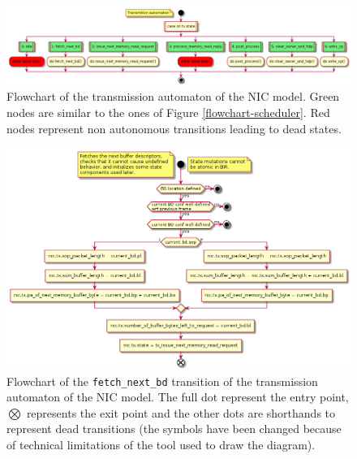 \documentclass[10pt,a4paper]{article}
\begin{document}
\begin{figure}[htbp]
	\includegraphics[width=\columnwidth]{figures/flowchart-tx.png}
	\centering
	\caption{Flowchart of the transmission automaton of the NIC model. Green nodes are similar to the ones of Figure \ref{flowchart-scheduler}. Red nodes represent non autonomous transitions leading to dead states.}
	\label{flowchart-tx}
\end{figure}

\begin{figure}[htbp]
	\includegraphics[width=\columnwidth]{figures/flowchart-tx_fetch_next_bd.png}
	\centering
	\caption{Flowchart of the \texttt{fetch\_next\_bd} transition of the transmission automaton of the NIC model. The full dot represent the entry point, $\bigotimes$ represents the exit point and the other dots are shorthands to represent dead transitions (the symbols have been changed because of technical limitations of the tool used to draw the diagram).}
	\label{flowchart-tx_fetch_next_bd}
\end{figure}
\end{document}
